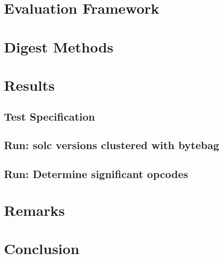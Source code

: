 \documentclass[]{article}
\begin{document}
\section{Evaluation Framework}


\section{Digest Methods}


\section{Results}
\subsection{Test Specification}


\subsection{Run: solc versions clustered with bytebag}


\subsection{Run: Determine significant opcodes}




\section{Remarks}


\section{Conclusion}


\printbibliography
\end{document}
